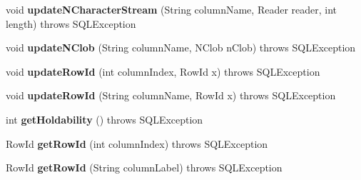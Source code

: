 \begin{DoxyCompactItemize}
\item 
\mbox{\label{classcom_1_1mysql_1_1cj_1_1jdbc_1_1result_1_1_result_set_impl_a6a0e707bf6f2fa3fde9c3b3d1d23733b}} 
void {\bfseries update\+N\+Character\+Stream} (String column\+Name, Reader reader, int length)  throws S\+Q\+L\+Exception 
\item 
\mbox{\label{classcom_1_1mysql_1_1cj_1_1jdbc_1_1result_1_1_result_set_impl_ac90a37ec81374f3cb07902d345aa38cf}} 
void {\bfseries update\+N\+Clob} (String column\+Name, N\+Clob n\+Clob)  throws S\+Q\+L\+Exception 
\item 
\mbox{\label{classcom_1_1mysql_1_1cj_1_1jdbc_1_1result_1_1_result_set_impl_a8c91a6572ee12df2c1b8229af9c48fe4}} 
void {\bfseries update\+Row\+Id} (int column\+Index, Row\+Id x)  throws S\+Q\+L\+Exception 
\item 
\mbox{\label{classcom_1_1mysql_1_1cj_1_1jdbc_1_1result_1_1_result_set_impl_a76cab05cbda780cf5f0a57325637b31a}} 
void {\bfseries update\+Row\+Id} (String column\+Name, Row\+Id x)  throws S\+Q\+L\+Exception 
\item 
\mbox{\label{classcom_1_1mysql_1_1cj_1_1jdbc_1_1result_1_1_result_set_impl_acc4ad21ac9b1ac5dffb380f6a2dbdcb7}} 
int {\bfseries get\+Holdability} ()  throws S\+Q\+L\+Exception 
\item 
\mbox{\label{classcom_1_1mysql_1_1cj_1_1jdbc_1_1result_1_1_result_set_impl_af290d66ffbdd57b6123ca8d2cdda412a}} 
Row\+Id {\bfseries get\+Row\+Id} (int column\+Index)  throws S\+Q\+L\+Exception 
\item 
\mbox{\label{classcom_1_1mysql_1_1cj_1_1jdbc_1_1result_1_1_result_set_impl_a10a1ac488e017856ab8f35bf36559990}} 
Row\+Id {\bfseries get\+Row\+Id} (String column\+Label)  throws S\+Q\+L\+Exception 
\item 
\mbox{\label{classcom_1_1mysql_1_1cj_1_1jdbc_1_1result_1_1_result_set_impl_a7104035f041ddff5ee887c9aff25eac9}} 

\end{DoxyCompactItemize}
